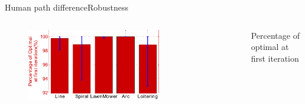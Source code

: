 \begin{frame}{Human path difference}{Robustness}
\bigskip

\begin{columns}
\begin{minipage}{\textwidth}
\begin{figure}
\centering
\includegraphics[width=0.7\textwidth]{./figure/InitOptInDiffHMP}
\end{figure}
\end{minipage}
\begin{center}
{\small
\textcolor{metric-OFI}{Percentage of optimal at first iteration}}
\end{center}
\end{columns}

\end{frame}